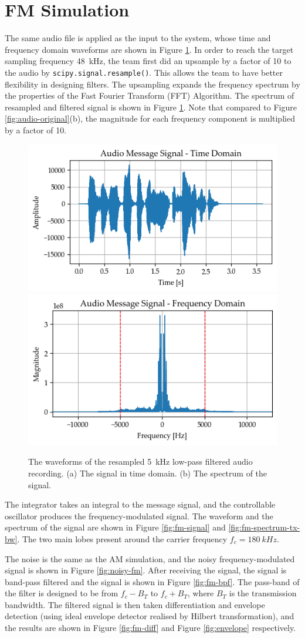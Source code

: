 \documentclass[../ECE459FinalProjectReport.tex]{subfiles}
\begin{document}
\section{FM Simulation}
The same audio file is applied as the input to the system, whose time and frequency domain waveforms are shown in Figure \ref{fig:audio-spectrum}. In order to reach the target sampling frequency \SI{48}{kHz}, the team first did an upsample by a factor of 10 to the audio by \verb|scipy.signal.resample()|. This allows the team to have better flexibility in designing filters. The upsampling expands the frequency spectrum by the properties of the Fast Fourier Transform (FFT) Algorithm. The spectrum of resampled and filtered signal is shown in Figure \ref{fig:audio-spectrum}. Note that compared to Figure \ref{fig:audio-original}(b), the magnitude for each frequency component is multiplied by a factor of 10.
\begin{figure}[tb]
    \centering
    \includegraphics[width=0.49\linewidth]{plots/audio_time.png}
    \includegraphics[width=0.49\linewidth]{plots/audio_spectrum.png}
    \caption{The waveforms of the resampled \SI{5}{kHz} low-pass filtered audio recording. (a) The signal in time domain. (b) The spectrum of the signal.}
    \label{fig:audio-spectrum}
\end{figure}

The integrator takes an integral to the message signal, and the controllable oscillator produces the frequency-modulated signal. The waveform and the spectrum of the signal are shown in Figure \ref{fig:fm-signal} and \ref{fig:fm-spectrum-tx-bw}. The two main lobes present around the carrier frequency $f_c = \SI{180}{kHz}$.

The noise is the same as the AM simulation, and the noisy frequency-modulated signal is shown in Figure \ref{fig:noisy-fm}. After receiving the signal, the signal is band-pass filtered and the signal is shown in Figure \ref{fig:fm-bpf}. The pass-band of the filter is designed to be from $f_c - B_T$ to $f_c + B_T$, where $B_T$ is the transmission bandwidth. The filtered signal is then taken differentiation and envelope detection (using ideal envelope detector realised by Hilbert transformation), and the results are shown in Figure \ref{fig:fm-diff} and Figure \ref{fig:envelope} respectively.
\end{document}
